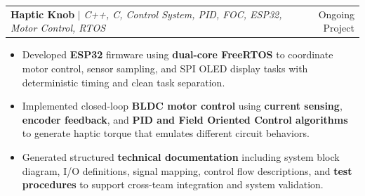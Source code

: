 \documentclass[letterpaper,11pt]{article}
\makeatletter
\newcommand{\resumeItem}[1]{
  \item\small{
    {#1 \vspace{-2pt}}
  }
}
\newcommand{\resumeProjectHeading}[2]{
    \item
    \begin{tabular*}{0.97\textwidth}{l@{\extracolsep{\fill}}r}
      \small#1 & #2 \\
    \end{tabular*}\vspace{-7pt}
}
\newcommand{\resumeItemListStart}{\begin{itemize}}
\newcommand{\resumeItemListEnd}{\end{itemize}\vspace{-5pt}}
\makeatother
\begin{document}
          
          


        \resumeProjectHeading
          {\textbf{Haptic Knob} $|$ \emph{C++, C, Control System, PID, FOC, ESP32, Motor Control, RTOS}}{Ongoing Project}
          
        \resumeItemListStart
        
        \resumeItem{Developed \textbf{ESP32} firmware using \textbf{dual-core FreeRTOS} to coordinate motor control, sensor sampling, and SPI OLED display 
        tasks with deterministic timing and clean task separation.}
        
        \resumeItem{Implemented closed-loop \textbf{BLDC motor control} using \textbf{current sensing}, \textbf{encoder feedback}, and \textbf{PID and Field  Oriented Control algorithms} to generate haptic torque that emulates different circuit behaviors.}

        \resumeItem{Generated structured \textbf{technical documentation} including system block diagram, I/O definitions, signal mapping, control flow descriptions, and \textbf{test procedures} to support cross-team integration and system validation.}

        \resumeItemListEnd

        
\end{document}
